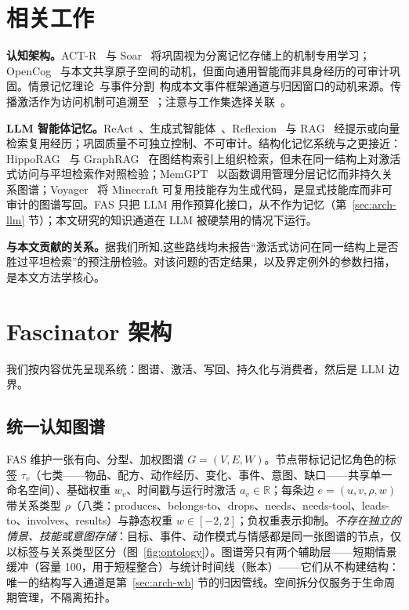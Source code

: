 \documentclass[10pt,a4paper]{ctexart}
\begin{document}
\section{相关工作}
\label{sec:related}

\textbf{认知架构。}ACT-R~\citep{anderson2004integrated} 与 Soar~\citep{laird2012soar} 将巩固视为分离记忆存储上的机制专用学习；OpenCog~\citep{hart2008opencog} 与本文共享原子空间的动机，但面向通用智能而非具身经历的可审计巩固。情景记忆理论~\citep{tulving1983elements,baddeley2000episodic}与事件分割~\citep{zacks2007event,schacter2007remembering}构成本文事件框架通道与归因窗口的动机来源。传播激活作为访问机制可追溯至~\citet{collins1975spreading}；注意与工作集选择关联~\citet{itti2001computational,posner1980orienting,cowan2001magical}。

\textbf{LLM 智能体记忆。}ReAct~\citep{yao2023react}、生成式智能体~\citep{park2023generative}、Reflexion~\citep{shinn2023reflexion} 与 RAG~\citep{lewis2020rag} 经提示或向量检索复用经历；巩固质量不可独立控制、不可审计。结构化记忆系统与之更接近：HippoRAG~\citep{gutierrez2024hipporag} 与 GraphRAG~\citep{edge2024graphrag} 在图结构索引上组织检索，但未在同一结构上对激活式访问与平坦检索作对照检验；MemGPT~\citep{packer2023memgpt} 以函数调用管理分层记忆而非持久关系图谱；Voyager~\citep{wang2023voyager} 将 Minecraft 可复用技能存为生成代码，是显式技能库而非可审计的图谱写回。FAS 只把 LLM 用作预算化接口，从不作为记忆（第~\ref{sec:arch-llm} 节）；本文研究的知识通道在 LLM 被硬禁用的情况下运行。

\textbf{与本文贡献的关系。}据我们所知,这些路线均未报告“激活式访问在同一结构上是否胜过平坦检索”的预注册检验。对该问题的否定结果，以及界定例外的参数扫描，是本文方法学核心。

\section{Fascinator 架构}
\label{sec:arch}

我们按内容优先呈现系统：图谱、激活、写回、持久化与消费者，然后是 LLM 边界。

\subsection{统一认知图谱}
\label{sec:arch-graph}
FAS 维护一张有向、分型、加权图谱 $G=(V,E,W)$。节点带标记记忆角色的标签 $\tau_v$（七类——物品、配方、动作经历、变化、事件、意图、缺口——共享单一命名空间）、基础权重 $w_v$、时间戳与运行时激活 $a_v\in\mathbb{R}$；每条边 $e=(u,v,\rho,w)$ 带关系类型 $\rho$（八类：produces、belongs-to、drops、needs、needs-tool、leads-to、involves、results）与静态权重 $w\in[-2,2]$；负权重表示抑制。\emph{不存在独立的情景、技能或意图存储}：目标、事件、动作模式与情感都是同一张图谱的节点，仅以标签与关系类型区分（图~\ref{fig:ontology}）。图谱旁只有两个辅助层——短期情景缓冲（容量 100，用于短程整合）与统计时间线（账本）——它们从不构建结构：唯一的结构写入通道是第~\ref{sec:arch-wb} 节的归因管线。空间拆分仅服务于生命周期管理，不隔离拓扑。
\end{document}
